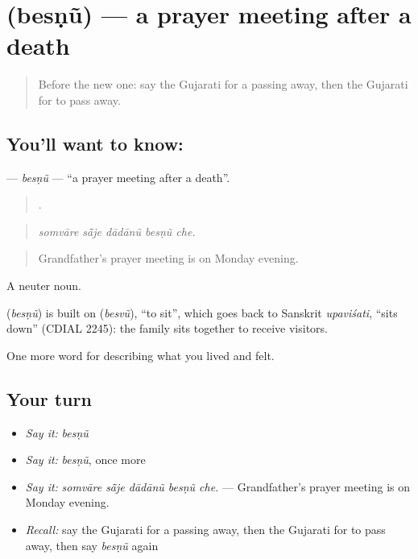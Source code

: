 \section[\texorpdfstring{\gu{બેસણું} (besṇũ)}{બેસણું (besṇũ)}]{ (besṇũ) — a prayer meeting after a death}

\label{lesson:GU-C499-besnu}



\begin{quote}
Before the new one: say the Gujarati for a passing away, then the Gujarati for to pass away.
\end{quote}

\subsection*{You'll want to know: }
\textbf{} — \emph{besṇũ} — \textquotedblleft{}a prayer meeting after a death\textquotedblright{}.

\begin{quote}
    .
\end{quote}

\begin{quote}
\emph{somvāre sā̃je dādānũ besṇũ che.}
\end{quote}

\begin{quote}
Grandfather's prayer meeting is on Monday evening.
\end{quote}

A neuter noun.

\begin{cousinweb}
\textbf{} (\emph{besṇũ}) is built on \textbf{} (\emph{besvũ}), \textquotedblleft{}to sit\textquotedblright{}, which goes back to Sanskrit \emph{upaviśati}, \textquotedblleft{}sits down\textquotedblright{} (CDIAL 2245): the family sits together to receive visitors.
\end{cousinweb}

\begin{grammarlens}[title={What you've built}]
One more word for describing what you lived and felt.
\end{grammarlens}

\subsection*{Your turn}
\begin{itemize}
\raggedright
  \item \emph{Say it:} \emph{besṇũ}
  \item \emph{Say it:} \emph{besṇũ}, once more
  \item \emph{Say it:} \emph{somvāre sā̃je dādānũ besṇũ che.} — Grandfather's prayer meeting is on Monday evening.
  \item \emph{Recall:} say the Gujarati for a passing away, then the Gujarati for to pass away, then say \emph{besṇũ} again
\end{itemize}

